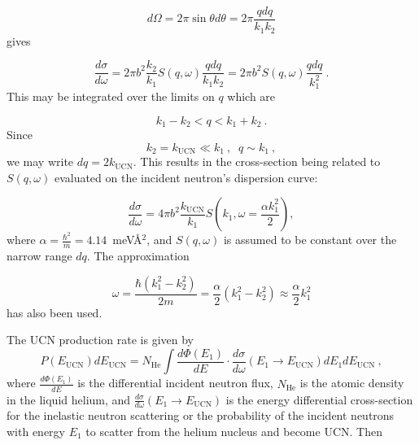 \begin{equation}
d\Omega=2 \pi \sin \theta d \theta = 2 \pi \frac{q dq}{k_1 k_2}
\end{equation}
gives

\begin{equation}
 \frac{d\sigma}{d\omega}=2\pi b^2 \frac{k_2}{k_1}S(q,\omega)\frac{q
   dq}{k_1 k_2}=2\pi b^2 S(q,\omega)\frac{q dq}{k_1^2}~.
\end{equation}
This may be integrated over the limits on $q$ which are

\begin{equation}
  k_1-k_2 < q < k_1+k_2~.
\end{equation}
Since
\begin{equation}
k_2=k_{\text{UCN}} \ll k_1~, \; \; q\sim k_1~,
\end{equation}
we may write $dq=2k_{\text{UCN}}$. This results in the cross-section
being related to $S(q,\omega)$ evaluated on the incident neutron's
dispersion curve:

\begin{equation}
\frac{d\sigma}{d\omega}=4\pi b^2 \frac{k_{\text{UCN}}}{k_1}S \left(
k_1, \omega=\frac{\alpha k_1^2}{2} \right),
\end{equation}
where $\alpha=\frac{\hbar^2}{m}=4.14$~meV\AA$^2$, and $S(q,\omega)$ is
assumed to be constant over the narrow range $dq$. The approximation

\begin{equation}
\omega=\frac{\hbar (k_1^2-k_2^2)}{2m}=\frac{\alpha}{2} (k_1^2 -
k_2^2)\approx \frac{\alpha}{2}k_1^2
\end{equation}
has also been used.

The UCN production rate is given by
\begin{equation}
\label{UCN_production}
P(E_{\text{UCN}}) dE_{\text{UCN}} = N_{\text{He}} \int \frac{d\Phi
  (E_1)}{dE}\cdot \frac{d \sigma}{d \omega}(E_1 \rightarrow
E_{\text{UCN}}) dE_1 dE_{\text{UCN}}~,
\end{equation}
where $\frac{d\Phi (E_1)}{dE}$ is the differential incident neutron
flux, $N_{\text{He}}$ is the atomic density in the liquid helium, and
$\frac{d \sigma}{d \omega}(E_1 \rightarrow E_{\text{UCN}})$ is the
energy differential cross-section for the inelastic neutron scattering
or the probability of the incident neutrons with energy $E_1$ to
scatter from the helium nucleus and become UCN.  Then

